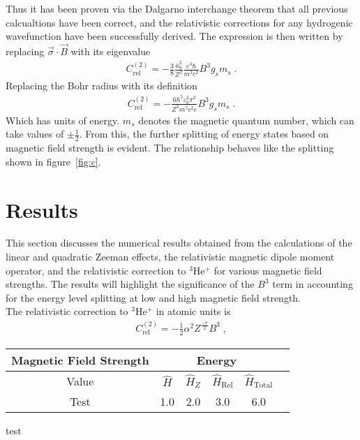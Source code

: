             \noindent Thus it has been proven via the Dalgarno interchange theorem that all previous calcualtions have been correct, and the relativistic corrections for any hydrogenic wavefunction have been successfully derived. The expression is then written by replacing $\vec{\sigma} \cdot \vec{B}$ with its eigenvalue 
            \begin{align}
                C_{\text{rel}}^{(2)} = -\frac{3}{8} \frac{\bar{a}_0^2}{Z^2}\frac{ e^3 \hbar}{ m^3 c^2}B^3g_s m_s\;.
            \end{align}
            \noindent Replacing the Bohr radius with its definition
            \begin{align}
                C_{\text{rel}}^{(2)} = - \frac{6\hbar^5 \varepsilon_0^2 \pi^2}{Z^2 m^5 c^2 e} B^3 g_s m_s\;.
            \end{align}
            \noindent Which has units of energy. $m_s$ denotes the magnetic quantum number, which can take values of $\pm \frac{1}{2}$. From this, the further splitting of energy states based on magnetic field strength is evident. The relationship behaves like the splitting shown in figure~\ref{fig:c}.
    \section{Results}\label{sec:results}
        This section discusses the numerical results obtained from the calculations of the linear and quadratic Zeeman effects, the relativistic magnetic dipole moment operator, and the relativistic correction to $^3$He$^+$ for various magnetic field strengths. The results will highlight the significance of the $B^3$ term in accounting for the energy level splitting at low and high magnetic field strength.\\

        The relativistic correction to $^3$He$^+$ in atomic units is
        \begin{align}
            C_{\text{rel}}^{(2)} = -\frac{1}{2} \alpha^2 Z^{\frac{-7}{2}} B^3\;,
        \end{align}
        \begin{table}[h]
            \centering
            \renewcommand{\arraystretch}{1.5} %
            \begin{tabular}{|c|c|c|c|c|c|}
                \hline
                \multicolumn{1}{|c|}{Magnetic Field Strength} & \multicolumn{4}{c|}{Energy} \\ \hline
                Value & $\hat{H}$ & $\hat{H}_Z$ & $\hat{H}_{\text{Rel}}$ & $\hat{H}_{\text{Total}}$ \\ \hline
                Test & 1.0 & 2.0 & 3.0 & 6.0 \\ %
                \hline
            \end{tabular}
        \end{table}

        test \cite{Drake_1972}
